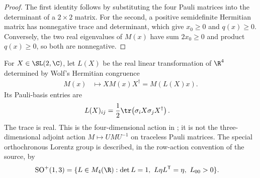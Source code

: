 \begin{proof}\leanok
    The first identity follows by substituting the four Pauli matrices into
    the determinant of a $2\times2$ matrix. For the second, a positive
    semidefinite Hermitian matrix has nonnegative trace and determinant, which
    give $x_0\geq0$ and $q(x)\geq0$. Conversely, the two real eigenvalues of
    $M(x)$ have sum $2x_0\geq0$ and product $q(x)\geq0$, so both are
    nonnegative.
\end{proof}

\begin{definition}
    \label{def:spinor_action_minkowski}
    \leanok
    For $X\in\SL(2,\C)$, let $L(X)$ be the real linear transformation of
    $\R^4$ determined by Wolf's Hermitian congruence
    \begin{align}
        M(x)&\longmapsto XM(x)X^\dagger=M(L(X)x).
        \label{eq:representations_spinor_congruence}
    \end{align}
    Its Pauli-basis entries are
    \begin{align}
        L(X)_{ij}
        &=\frac12\tr\!\left(\sigma_iX\sigma_jX^\dagger\right).
        \label{eq:representations_spinor_entries}
    \end{align}
    The trace is real.  This is the four-dimensional action in
    \cite[Eq.~(2.41)]{Wolf2012Quantum}; it is not the three-dimensional
    adjoint action $M\mapsto UMU^{-1}$ on traceless Pauli matrices.
    The special orthochronous Lorentz group is described, in the row-action
    convention of the source, by
    \begin{align}
        \mathrm{SO}^+(1,3)
        &=\{L\in M_4(\R):\det L=1,\ L\eta L^{\mathsf T}=\eta,\ L_{00}>0\}.
        \label{eq:representations_special_orthochronous_lorentz}
    \end{align}
\end{definition}

